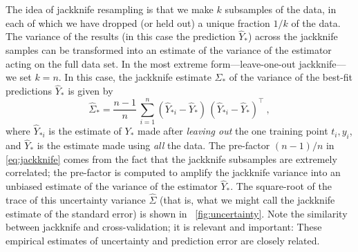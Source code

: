 \documentclass[12pt,letterpaper]{article}
\begin{document}
The idea of jackknife resampling is that we make $k$ subsamples of the data, in each of which we have dropped (or held out) a unique fraction $1/k$ of the data.
The variance of the results (in this case the prediction $\hat{Y}_\ast$) across the jackknife samples can be transformed into an estimate of the variance of the estimator acting on the full data set.
In the most extreme form---leave-one-out jackknife---we set $k=n$.
In this case, the jackknife estimate $\hat{\Sigma}_\ast$ of the variance of the best-fit predictions $\hat{Y}_\ast$ is given by
\begin{equation}\label{eq:jackknife}
    \hat{\Sigma}_\ast = \frac{n-1}{n}\,\sum_{i=1}^n (\hat{Y}_{\ast i} - \hat{Y}_\ast)\,(\hat{Y}_{\ast i} - \hat{Y}_\ast)^\top
    ~,
\end{equation}
where $\hat{Y}_{\ast i}$ is the estimate of $Y_\ast$ made after \emph{leaving out} the one training point $t_i, y_i$, and $\hat{Y}_\ast$ is the estimate made using \emph{all} the data.
The pre-factor $(n-1)/n$ in \eqref{eq:jackknife} 
comes from the fact that the jackknife subsamples are extremely correlated; the pre-factor is computed to amplify the jackknife variance into an unbiased estimate of the variance of the estimator $\hat{Y}_\ast$.
The square-root of the trace of this uncertainty variance $\hat{\Sigma}$ (that is, what we might call the jackknife estimate of the standard error) is shown in \figurename~\ref{fig:uncertainty}.
Note the similarity between jackknife and cross-validation; it is relevant and important: These empirical estimates of uncertainty and prediction error are closely related.
\end{document}

